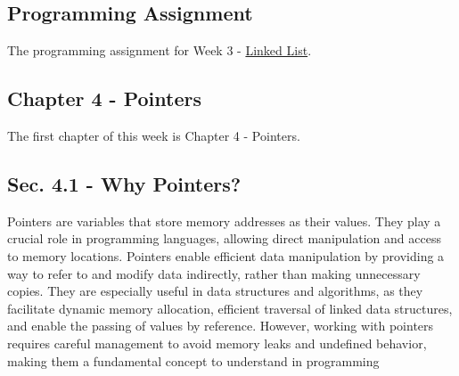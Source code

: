 \subsection{Programming Assignment}
The programming assignment for Week 3 - \href{https://github.com/cu-cspb-2270-Summer-2023/pa2-RelativiBit}{Linked List}.

\subsection{Chapter 4 - Pointers}

The first chapter of this week is Chapter 4 - Pointers.

\subsection*{Sec. 4.1 - Why Pointers?}

Pointers are variables that store memory addresses as their values. They play a crucial role in programming languages, allowing direct manipulation and access to memory locations. Pointers enable efficient data manipulation 
by providing a way to refer to and modify data indirectly, rather than making unnecessary copies. They are especially useful in data structures and algorithms, as they facilitate dynamic memory allocation, efficient traversal 
of linked data structures, and enable the passing of values by reference. However, working with pointers requires careful management to avoid memory leaks and undefined behavior, making them a fundamental concept to understand 
in programming

